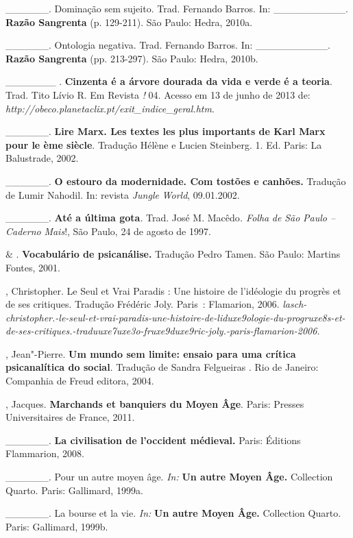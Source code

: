 \begin{Parskip}
\_\_\_\_\_\_. Dominação sem sujeito. Trad. Fernando Barros. In:
\_\_\_\_\_\_\_\_\_\_. \textbf{Razão Sangrenta} (p. 129-211). São Paulo:
Hedra, 2010a.

\_\_\_\_\_\_. Ontologia negativa. Trad. Fernando Barros. In:
\_\_\_\_\_\_\_\_\_\_. \textbf{Razão Sangrenta} (pp. 213-297). São Paulo:
Hedra, 2010b.

\_\_\_\_\_\_\_ . \textbf{Cinzenta é a árvore dourada da vida e verde é a
teoria}. Trad. Tito Lívio R. Em Revista \emph{!} 04. Acesso em 13 de
junho de 2013 de:
\emph{http://obeco.planetaclix.pt/exit\_indice\_geral.htm}.

\_\_\_\_\_\_. \textbf{Lire Marx. Les textes les plus importants de Karl
Marx pour le ème siècle}. Tradução Hélène e Lucien Steinberg.
1. Ed. Paris: La Balustrade, 2002.

\_\_\_\_\_\_. \textbf{O estouro da modernidade. Com tostões e canhões.}
Tradução de Lumir Nahodil. In: revista \emph{Jungle} \emph{World},
09.01.2002.

\_\_\_\_\_\_. \textbf{Até a última gota}. Trad. José M. Macêdo\emph{.
Folha} \emph{de} \emph{São} \emph{Paulo -- Caderno} \emph{Mais}!, São
Paulo, 24 de agosto de 1997.

 \& . \textbf{Vocabulário de psicanálise.} Tradução
Pedro Tamen. São Paulo: Martins Fontes, 2001.

, Christopher. Le Seul et Vrai Paradis : Une histoire de
l'idéologie du progrès et de ses critiques. Tradução Frédéric Joly.
Paris~: Flamarion,
2006. \emph{lasch-christopher.-le-seul-et-vrai-paradis-une-histoire-de-liduxe9ologie-du-progruxe8s-et-de-ses-critiques.-traduuxe7uxe3o-fruxe9duxe9ric-joly.-paris-flamarion-2006.}

, Jean"-Pierre. \textbf{Um mundo sem limite: ensaio para uma
crítica psicanalítica do social}. Tradução de Sandra Felgueiras .
Rio de Janeiro: Companhia de Freud editora, 2004.

, Jacques. \textbf{Marchands et banquiers du Moyen Âge}. Paris:
Presses Universitaires de France, 2011.

\_\_\_\_\_\_. \textbf{La civilisation de l'occident médieval.} Paris:
Éditions Flammarion, 2008.

\_\_\_\_\_\_. Pour un autre moyen âge. \emph{In:} \textbf{Un autre Moyen
Âge.} Collection Quarto. Paris: Gallimard, 1999a.

\_\_\_\_\_\_. La bourse et la vie. \emph{In:} \textbf{Un autre Moyen
Âge.} Collection Quarto. Paris: Gallimard, 1999b.


\end{Parskip}
